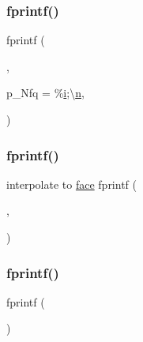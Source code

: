 \subsubsection{\texorpdfstring{fprintf()}{fprintf()}\hspace{0.1cm}{\footnotesize\ttfamily [6/12]}}
{\footnotesize\ttfamily fprintf (\begin{DoxyParamCaption}\item[{\hyperlink{a00473_ae0527cbfd56392d5095a691bbf10ba5b}{f\+ID}}]{,  }\item[{\textquotesingle{}int}]{p\+\_\+\+Nfq = {\ttfamily \%\hyperlink{a00608_afb6aca53df96564f2adf086c942453ec}{i};\textbackslash{}\hyperlink{a00623_a781a04ab095280f838ff3eb0e51312e0}{n}\textquotesingle{}},  }\item[{\hyperlink{a01014_a8e84225359762b34b0c20c9e75fc53b1}{Nfq}}]{ }\end{DoxyParamCaption})}

\mbox{\label{a01014_a57eae7ff361b57d6f8a4375d341ee34e}} 
\subsubsection{\texorpdfstring{fprintf()}{fprintf()}\hspace{0.1cm}{\footnotesize\ttfamily [7/12]}}
{\footnotesize\ttfamily interpolate to \hyperlink{a00611_ac4ec0037ba529da25bf084669a45f60c}{face} fprintf (\begin{DoxyParamCaption}\item[{\hyperlink{a00473_ae0527cbfd56392d5095a691bbf10ba5b}{f\+ID}}]{,  }\item[{\textquotesingle{}\#endif\textquotesingle{}}]{ }\end{DoxyParamCaption})}

\mbox{\label{a01014_a9a48c28a28fb3ac51e7a0f832b5755b1}} 
\subsubsection{\texorpdfstring{fprintf()}{fprintf()}\hspace{0.1cm}{\footnotesize\ttfamily [8/12]}}
{\footnotesize\ttfamily fprintf (\begin{DoxyParamCaption}\item[{\hyperlink{a00473_ae0527cbfd56392d5095a691bbf10ba5b}{f\+ID}}]{ }\end{DoxyParamCaption})}

